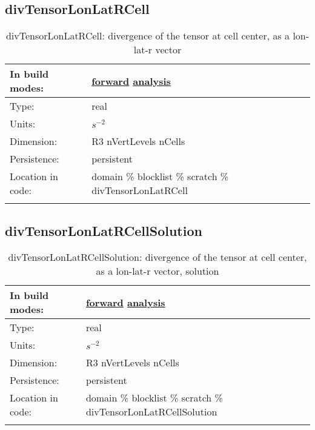 \subsection[divTensorLonLatRCell]{divTensorLonLatRCell}
\label{subsec:var_sec_scratch_divTensorLonLatRCell}
\begin{center}
\begin{longtable}{| p{2.0in} | p{4.0in} |}
        \hline 
        In build modes: & \hyperref[subsec:forward_var_tab_scratch]{forward} \hyperref[subsec:analysis_var_tab_scratch]{analysis} \\
        \hline 
        Type: & real \\
        \hline 
        Units: & $s^{-2}$ \\
        \hline 
        Dimension: & R3 nVertLevels nCells \\
        \hline 
        Persistence: & persistent \\
        \hline 
		 Location in code: & domain \% blocklist \% scratch \% divTensorLonLatRCell \\
		 \hline 
    \caption{divTensorLonLatRCell: divergence of the tensor at cell center, as a lon-lat-r vector}
\end{longtable}
\end{center}
\subsection[divTensorLonLatRCellSolution]{divTensorLonLatRCellSolution}
\label{subsec:var_sec_scratch_divTensorLonLatRCellSolution}
\begin{center}
\begin{longtable}{| p{2.0in} | p{4.0in} |}
        \hline 
        In build modes: & \hyperref[subsec:forward_var_tab_scratch]{forward} \hyperref[subsec:analysis_var_tab_scratch]{analysis} \\
        \hline 
        Type: & real \\
        \hline 
        Units: & $s^{-2}$ \\
        \hline 
        Dimension: & R3 nVertLevels nCells \\
        \hline 
        Persistence: & persistent \\
        \hline 
		 Location in code: & domain \% blocklist \% scratch \% divTensorLonLatRCellSolution \\
		 \hline 
    \caption{divTensorLonLatRCellSolution: divergence of the tensor at cell center, as a lon-lat-r vector, solution}
\end{longtable}
\end{center}
